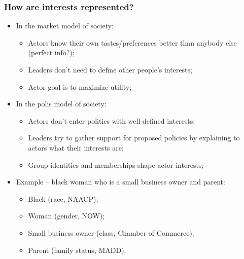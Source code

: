\documentclass[aspectratio=169]{beamer}
\theoremstyle{principle}
\begin{document}
\begin{frame}
\frametitle{How are interests represented?}
\begin{itemize}
\item In the market model of society: 
\begin{itemize}
\item Actors know their own tastes/preferences better than anybody else (perfect info?);
\item Leaders don't need to define other people's interests;
\item Actor goal is to maximize utility;
\end{itemize}
\bigskip
\bigskip
\item In the polis model of society:
\begin{itemize}
\item Actors don't enter politics with well-defined interests;
\item Leaders try to gather support for proposed policies by explaining to actors what their interests are;
\item Group identities and memberships shape actor interests;
\end{itemize}
\bigskip
\bigskip
\item Example -- black woman who is a small business owner and parent:
\begin{itemize}
\item Black (race, NAACP);
\item Woman (gender, NOW);
\item Small business owner (class, Chamber of Commerce);
\item Parent (family status, MADD).
\end{itemize}
\end{itemize}
\end{frame}
\end{document}
